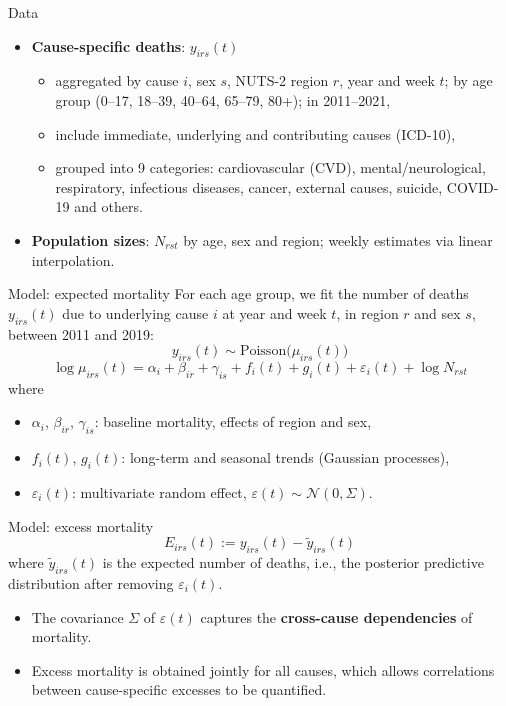 \documentclass[aspectratio=169,10pt]{beamer}
\newcommand{\compresslist}{%
  \setlength{\itemsep}{2pt}%
  \setlength{\parskip}{0pt}%
  \setlength{\parsep}{0pt}%
}
\begin{document}
\begin{frame}{Data}
  \begin{itemize}\compresslist
    \item \textbf{Cause-specific deaths}: $y_{irs}(t)$
      \begin{itemize}\compresslist
        \item aggregated by cause $i$, sex $s$, NUTS-2 region $r$, year and week $t$;
              by age group (0--17, 18--39, 40--64, 65--79, 80+); in 2011--2021,
        \item include immediate, underlying and contributing causes (ICD-10),
        \item grouped into 9 categories: cardiovascular (CVD), mental/neurological,
              respiratory, infectious diseases, cancer, external causes, suicide,
              COVID-19 and others.
      \end{itemize}
    \item \textbf{Population sizes}: $N_{rst}$ by age, sex and region;
          weekly estimates via linear interpolation.
  \end{itemize}
\end{frame}

\begin{frame}{Model: expected mortality}
  For each age group, we fit the number of deaths $y_{irs}(t)$ due to underlying
  cause $i$ at year and week $t$, in region $r$ and sex $s$, between 2011 and 2019:
  \[
    y_{irs}(t) \sim \text{Poisson}\big(\mu_{irs}(t)\big)
  \]
  \[
    \log \mu_{irs}(t) = \alpha_i + \beta_{ir} + \gamma_{is}
      + f_{i}(t) + g_{i}(t) + \varepsilon_i(t) + \log N_{rst}
  \]
  where
  \begin{itemize}\compresslist
    \item $\alpha_i$, $\beta_{ir}$, $\gamma_{is}$: baseline mortality, effects of
          region and sex,
    \item $f_{i}(t)$, $g_{i}(t)$: long-term and seasonal trends (Gaussian processes),
    \item $\varepsilon_i(t)$: multivariate random effect,
          $\varepsilon(t) \sim \mathcal{N}(0,\Sigma)$.
  \end{itemize}
\end{frame}

\begin{frame}{Model: excess mortality}
  \[
    E_{irs}(t) := y_{irs}(t) - \tilde{y}_{irs}(t)
  \]
  where $\tilde{y}_{irs}(t)$ is the expected number of deaths, i.e., the posterior
  predictive distribution after removing $\varepsilon_i(t)$.
  \vfill
  \begin{itemize}\compresslist
    \item The covariance $\Sigma$ of $\varepsilon(t)$ captures the
          \textbf{cross-cause dependencies} of mortality.
    \item Excess mortality is obtained jointly for all causes, which allows
          correlations between cause-specific excesses to be quantified.
  \end{itemize}
\end{frame}
\end{document}
